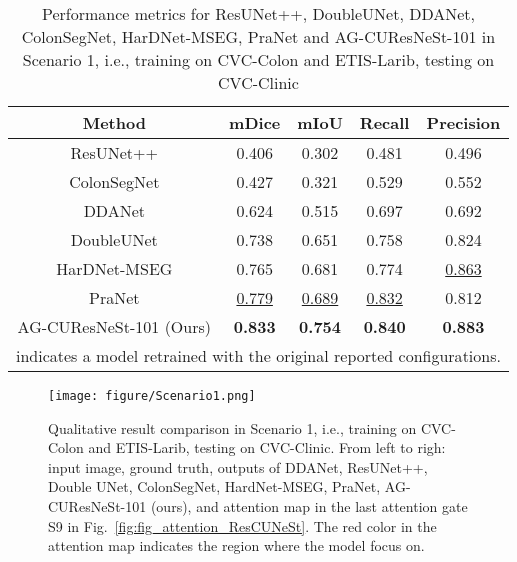 \documentclass[review, sort&compress]{elsarticle}
\begin{document}
\begin{table}[ht!]
\centering
\caption{Performance metrics for ResUNet++, DoubleUNet, DDANet, ColonSegNet, HarDNet-MSEG, PraNet and AG-CUResNeSt-101 in Scenario 1, i.e., training on CVC-Colon and ETIS-Larib, testing on CVC-Clinic}
\begin{tabular}{ c | c c c c}
\hline

Method & mDice       & mIoU    & Recall          & Precision        \\
\hline
\hline

ResUNet++ \cite{jha2019resunet++}  & 0.406 & 0.302 & 0.481 & 0.496 \\

ColonSegNet \cite{jha2021real}  & 0.427 &    0.321 & 0.529 & 0.552 \\

DDANet \cite{tomar2020ddanet}  & 0.624 & 0.515 & 0.697 & 0.692 \\

DoubleUNet \cite{jha2020doubleu}  & 0.738 &  0.651 & 0.758 & 0.824 \\

HarDNet-MSEG \cite{huang2021hardnet}  & 0.765 &  0.681 & 0.774 & \underline{0.863} \\

PraNet \cite{fan2020pranet}  & \underline{0.779} &   \underline{0.689} & \underline{0.832} & 0.812 \\

\hline
\hline

AG-CUResNeSt-101 (Ours) & \textbf{0.833} & \textbf{0.754} & \textbf{0.840} & \textbf{0.883}  \\
\hline

\multicolumn{5}{l}{ indicates a model retrained with the original reported configurations.
}
\end{tabular}
\label{tab_colon_etis_clinic_2}
\end{table}


\begin{figure*}[ht!]
\centering
\texttt{[image: figure/Scenario1.png]}
\caption{Qualitative result comparison in Scenario 1, i.e., training on CVC-Colon and ETIS-Larib, testing on CVC-Clinic. From left to righ: input image, ground truth, outputs of DDANet, ResUNet++, Double UNet, ColonSegNet, HardNet-MSEG, PraNet, AG-CUResNeSt-101 (ours), and attention map in the last attention gate S9 in Fig.~\ref{fig:fig_attention_ResCUNeSt}. The red color in the attention map indicates the region where the model focus on.}
\label{fig_colon_etis_clinic}
\end{figure*}
\end{document}

